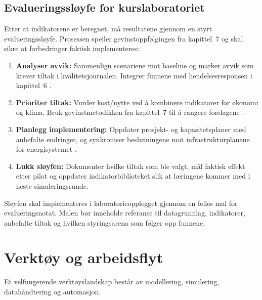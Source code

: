\subsection{Evalueringssløyfe for kurslaboratoriet}
Etter at indikatorene er beregnet, må resultatene gjennom en styrt evalueringssløyfe. Prosessen speiler gevinstoppfølgingen fra kapittel~7 og skal sikre at forbedringer faktisk implementeres:
\begin{enumerate}
    \item \textbf{Analyser avvik:} Sammenlign scenariene mot baseline og marker avvik som krever tiltak i kvalitetsjournalen. Integrer funnene med hendelsesresponsen i kapittel~6 \citep{statnett2024kontrolltarn}.
    \item \textbf{Prioriter tiltak:} Vurder kost/nytte ved å kombinere indikatorer for økonomi og klima. Bruk gevinstmetodikken fra kapittel~7 til å rangere forslagene \citep{digdir2022gevinst}.
    \item \textbf{Planlegg implementering:} Oppdater prosjekt- og kapasitetsplaner med anbefalte endringer, og synkroniser beslutningene mot infrastrukturplanene for energisystemet \citep{nve2023nettplan}.
    \item \textbf{Lukk sløyfen:} Dokumenter hvilke tiltak som ble valgt, mål faktisk effekt etter pilot og oppdater indikatorbiblioteket slik at læringene kommer med i neste simuleringsrunde.
\end{enumerate}
Sløyfen skal implementeres i laboratorieopplegget gjennom en felles mal for evalueringsnotat. Malen bør inneholde referanse til datagrunnlag, indikatorer, anbefalte tiltak og hvilken styringsarena som følger opp funnene.

\section{Verktøy og arbeidsflyt}
Et velfungerende verktøyslandskap består av modellering, simulering, datahåndtering og automasjon.

